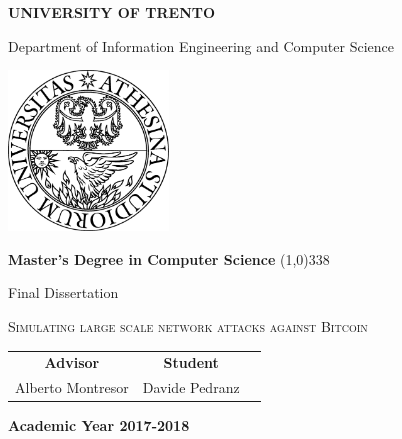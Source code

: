 \begin{titlepage}

	\pagestyle{empty}

	\vspace*{\fill}

	\begin{center}

		\vspace{-0.2cm}
		{
			\bfseries
			\Large {\huge U}NIVERSITY OF {\huge T}RENTO
		}

		\vspace{0.3cm}
		{\Large Department of Information Engineering and Computer Science}

		\vspace{0.6cm}
		\begin{center}
			\includegraphics[width=0.32\textwidth]{figures/unitn}
		\end{center}
		\vspace{0.6cm}

		{
			\bfseries
			\Large Master's Degree in Computer Science
		}
		\vspace{0.3cm}
		\line(1,0){338}
		\vspace{0.3cm}

		{
			\Large Final Dissertation
		}

		\vspace{2cm}
		{
			\begin{spacing}{0.9}
				\huge \textsc{Simulating large scale network attacks against Bitcoin}
			\end{spacing}
		}
		\vspace{2cm}

		\Large
		\begin{center}
			\begin{tabular}{ccc}
				{\bfseries Advisor} & \hspace{5cm} {\bfseries Student} \\
				Alberto Montresor   & \hspace{5cm} Davide Pedranz      \\
			\end{tabular}
		\end{center}

		\vspace{3cm}
		{
			\bfseries
			\large Academic Year 2017-2018
		}

	\end{center}

	\vfill

	\restoregeometry

\end{titlepage}

